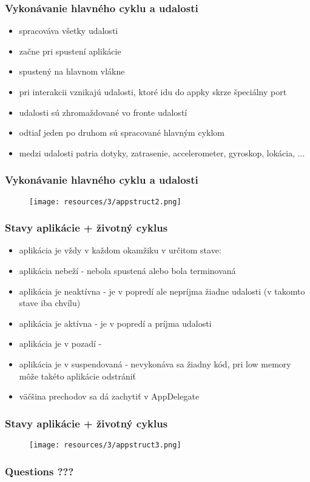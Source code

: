 \documentclass[serif,mathserif]{beamer}
\begin{document}
\begin{frame}
  \frametitle{Vykonávanie hlavného cyklu a udalosti}
  \begin{itemize}
  \item spracováva všetky udalosti \pause
  \item začne pri spustení aplikácie \pause
  \item spustený na hlavnom vlákne \pause
  \item pri interakcii vznikajú udalosti, ktoré idu do appky skrze špeciálny port \pause
    \item udalosti sú zhromaždované vo fronte udalostí \pause
    \item odtiaľ jeden po druhom sú spracované hlavným cyklom \pause
    \item medzi udalosti patria dotyky, zatrasenie, accelerometer, gyroskop, lokácia, ... 
  \end{itemize}
\end{frame}

\begin{frame}
  \frametitle{Vykonávanie hlavného cyklu a udalosti}
 \begin{figure}[h]
	\texttt{[image: resources/3/appstruct2.png]}
  \end{figure}
\end{frame}

\begin{frame}
  \frametitle{Stavy aplikácie + životný cyklus}
  \begin{itemize}
  \item aplikácia je vždy v každom okamžiku v určitom stave: \pause
  \item aplikácia nebeží - nebola spustená alebo bola terminovaná \pause
  \item aplikácia je neaktívna - je v popredí ale nepríjma žiadne udalosti (v takomto stave iba chvílu) \pause
  \item aplikácia je aktívna - je v popredí a príjma udalosti \pause
  \item aplikácia je v pozadí -  \pause
  \item aplikácia je v suspendovaná - nevykonáva sa žiadny kód, pri low memory môže takéto aplikácie odstrániť
    \item väčšina prechodov sa dá zachytiť v AppDelegate
  \end{itemize}
\end{frame}

\begin{frame}
  \frametitle{Stavy aplikácie + životný cyklus}
 \begin{figure}[h]
	\texttt{[image: resources/3/appstruct3.png]}
  \end{figure}
\end{frame}


\begin{frame}
  \frametitle{Questions ???}
\end{frame}
\end{document}
